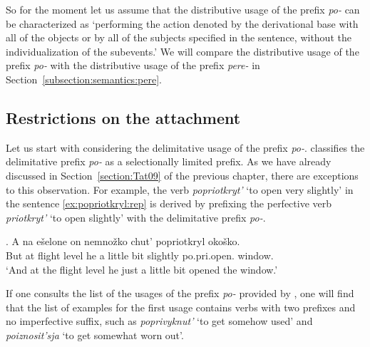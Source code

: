 So for the moment let us assume that the distributive usage of the prefix \textit{po-} can be characterized as `performing the action denoted by the derivational base with all of the objects or by all of the subjects specified in the sentence, without the individualization of the subevents.' We will compare the distributive usage of the prefix \textit{po-} with the distributive usage of the prefix \textit{pere-} in Section~\ref{subsection:semantics:pere}.

\subsection{Restrictions on the attachment} 
Let us start with considering the delimitative usage of the prefix \textit{po-}. \citet{Tatevosov:09} classifies the delimitative prefix \textit{po-} as a selectionally limited prefix. As we have already discussed in Section~\ref{section:Tat09} of the previous chapter, there are exceptions to this observation. For example, the verb \textit{popriotkryt'} `to open very slightly' in the sentence \ref{ex:popriotkryl:rep} is derived by prefixing the perfective verb \textit{priotkryt'} `to open slightly' with the delimitative prefix \textit{po-}.

\exg. \label{ex:popriotkryl:rep}A na e\v{s}elone on nemno\v{z}ko chut' popriotkryl oko\v{s}ko.\\
But at {flight level} he {a little bit} {slightly} po.pri.open. window.\\
\trans `And at the flight level he just a little bit opened the window.'\\

If one consults the list of the usages of the prefix \textit{po-} provided by \citet{Shvedova:82}, one will find that the list of examples for the first usage contains verbs with two prefixes and no imperfective suffix, such as \textit{poprivyknut'} `to get somehow used' and \textit{poiznosit'sja} `to get somewhat worn out'. 


